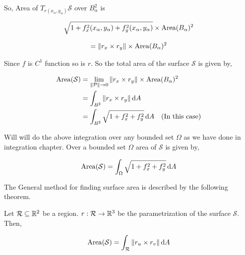 \documentclass[../Analysis-3.tex]{subfiles}
\begin{document}
So, Area of $T_{r(x_{\alpha},y_{\alpha})} \mathcal{S}$ over $B_{\alpha}^2$ is

$$\sqrt{1 + f_x^2(x_{\alpha},y_{\alpha}) + f_y^2(x_{\alpha},y_{\alpha})} \times \operatorname{Area}(B_{\alpha})^2$$

$$ = \norm{r_x \times r_y} \times \operatorname{Area}(B_{\alpha})^2$$

\pagebreak

Since $f$ is $C^1$ function so is $r$. So the total area of the surface $\mathcal{S}$ is given by,

\begin{align*}
  \operatorname{Area} (\mathcal{S})
   & = \lim_{\norm{\mathcal{P}} \to 0} \norm{r_x \times r_y} \times \operatorname{Area}(B_{\alpha})^2 \\
   & = \int_{B^2} \norm{r_x \times r_y} \, \dd A                                        \\
   & = \int_{B^2} \sqrt{1 + f_x^2 +f_y^2} \, \dd A \quad (\text{In this case})
\end{align*}

Will will do the above integration over any bounded set $\Omega$ as we have done in  integration chapter. Over a bounded set $\Omega$ area of $\mathcal{S}$ is given by,

\begin{equation}\index{Area}
  \Area (\mathcal{S}) =  \int_{\Omega} \sqrt{1 + f_x^2 +f_y^2} \, \dd A \label{eq:surfa}
\end{equation}

The General method for finding surface area is described by the following theorem.

\begin{Thm}{}{}
  Let $\mathcal{R} \subseteq \mathbb{R}^2$ be a region. $r : \mathcal{R} \to \mathbb{R}^3$ be the parametrization of the surface $\mathcal{S}$. Then,

  \[\operatorname{Area}(\mathcal{S}) = \int_{\mathcal{R}} \norm{r_u \times r_v} \, \dd A\]
\end{Thm}
\end{document}
